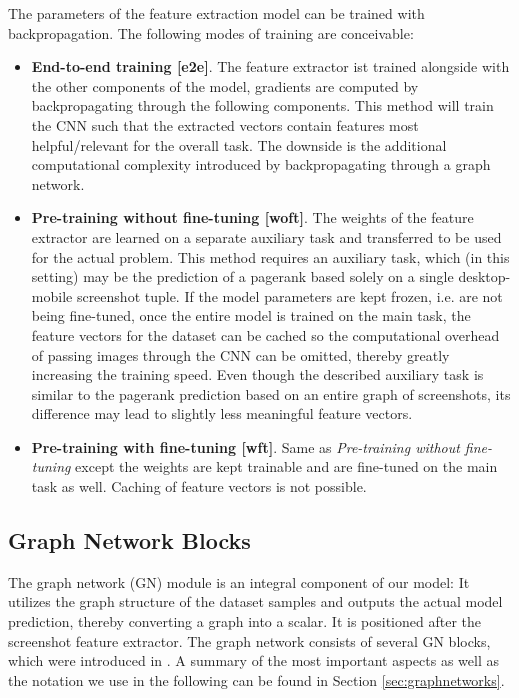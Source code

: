 The parameters of the feature extraction model can be trained with backpropagation. The following modes of training are conceivable:
\begin{itemize}
    \item \textbf{End-to-end training [e2e]}. The feature extractor ist trained alongside with the other components of the model, gradients are computed by backpropagating through the following components. This method will train the CNN such that the extracted vectors contain features most helpful/relevant for the overall task. The downside is the additional computational complexity introduced by backpropagating through a graph network.
    \item \textbf{Pre-training without fine-tuning [woft]}. The weights of the feature extractor are learned on a separate auxiliary task and transferred to be used for the actual problem. This method requires an auxiliary task, which (in this setting) may be the prediction of a pagerank based solely on a single desktop-mobile screenshot tuple. If the model parameters are kept frozen, i.e. are not being fine-tuned, once the entire model is trained on the main task, the feature vectors for the dataset can be cached so the computational overhead of passing images through the CNN can be omitted, thereby greatly increasing the training speed. Even though the described auxiliary task is similar to the pagerank prediction based on an entire graph of screenshots, its difference may lead to slightly less meaningful feature vectors.
    \item \textbf{Pre-training with fine-tuning [wft]}. Same as \textit{Pre-training without fine-tuning} except the weights are kept trainable and are fine-tuned on the main task as well. Caching of feature vectors is not possible.
\end{itemize}

\subsection{Graph Network Blocks}
\label{sec:gnblocks}

The graph network (GN) module is an integral component of our model: It utilizes the graph structure of the dataset samples and outputs the actual model prediction, thereby converting a graph into a scalar. It is positioned after the screenshot feature extractor. The graph network consists of several GN blocks, which were introduced in \cite{deepmind:graphnets}. A summary of the most important aspects as well as the notation we use in the following can be found in Section \ref{sec:graphnetworks}.

